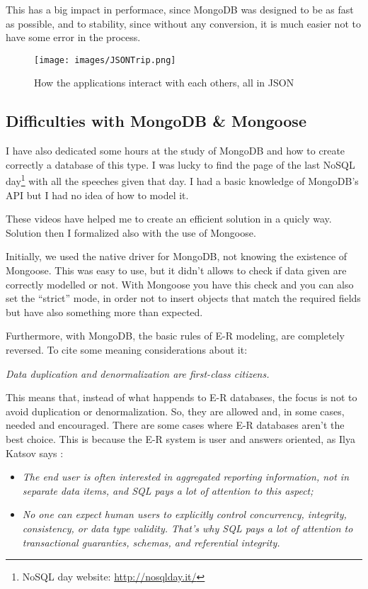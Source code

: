 This has a big impact in performace, since MongoDB was designed to be as fast as possible, and to stability, since without any conversion, it is much easier not to have some error in the process.

\begin{figure}[H]
\centering %
\texttt{[image: images/JSONTrip.png]}
\caption{How the applications interact with each others, all in JSON}
\label{fig:JSONTrip}
\end{figure}

\subsection{Difficulties with MongoDB \& Mongoose}
I have also dedicated some hours at the study of MongoDB and how to create correctly a database of this type. I was lucky to find the page of the last NoSQL day\footnote{NoSQL day website: \url{http://nosqlday.it/}} with all the speeches given that day. I had a basic knowledge of MongoDB's API but I had no idea of how to model it.

These videos have helped me to create an efficient solution in a quicly way. Solution then I formalized also with the use of Mongoose.

Initially, we used the native driver for MongoDB, not knowing the existence of Mongoose. This was easy to use, but it didn't allows to check if data given are correctly modelled or not. With Mongoose you have this check and you can also set the ``strict'' mode, in order not to insert objects that match the required fields but have also something more than expected.

Furthermore, with MongoDB, the basic rules of E-R modeling, are completely reversed. To cite some meaning considerations about it:

\begin{center}
	\textit{Data duplication and denormalization are first-class citizens.}\cite{website:nosqldatamodeling}
\end{center}

This means that, instead of what happends to E-R databases, the focus is not to avoid duplication or denormalization. So, they are allowed and, in some cases, needed and encouraged. There are some cases where E-R databases aren't the best choice. This is because the E-R system is user and answers oriented, as Ilya Katsov says \cite{website:nosqldatamodeling}:

\begin{itemize}
\item \textit{The end user is often interested in aggregated reporting information, not in separate data items, and SQL pays a lot of attention to this aspect;}
\item \textit{No one can expect human users to explicitly control concurrency, integrity, consistency, or data type validity. That’s why SQL pays a lot of attention to transactional guaranties, schemas, and referential integrity.}
\end{itemize}

